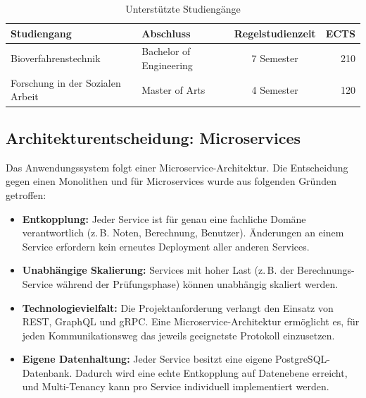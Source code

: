 \documentclass[12pt,a4paper,ngerman]{article}
\begin{document}
\begin{table}[H]
\centering
\caption{Unterstützte Studiengänge}
\begin{tabular}{llcr}
\toprule
\textbf{Studiengang} & \textbf{Abschluss} & \textbf{Regelstudienzeit} & \textbf{ECTS} \\
\midrule
Bioverfahrenstechnik & Bachelor of Engineering & 7 Semester & 210 \\
Forschung in der Sozialen Arbeit & Master of Arts & 4 Semester & 120 \\
\bottomrule
\end{tabular}
\end{table}

\subsection{Architekturentscheidung: Microservices}

Das Anwendungssystem folgt einer Microservice-Architektur. Die Entscheidung gegen einen Monolithen und für Microservices wurde aus folgenden Gründen getroffen:

\begin{itemize}[nosep]
\item \textbf{Entkopplung:} Jeder Service ist für genau eine fachliche Domäne verantwortlich (z.\,B. Noten, Berechnung, Benutzer). Änderungen an einem Service erfordern kein erneutes Deployment aller anderen Services.
\item \textbf{Unabhängige Skalierung:} Services mit hoher Last (z.\,B. der Berechnungs-Service während der Prüfungsphase) können unabhängig skaliert werden.
\item \textbf{Technologievielfalt:} Die Projektanforderung verlangt den Einsatz von REST, GraphQL und gRPC. Eine Microservice-Architektur ermöglicht es, für jeden Kommunikationsweg das jeweils geeignetste Protokoll einzusetzen.
\item \textbf{Eigene Datenhaltung:} Jeder Service besitzt eine eigene PostgreSQL-Datenbank. Dadurch wird eine echte Entkopplung auf Datenebene erreicht, und Multi-Tenancy kann pro Service individuell implementiert werden.
\end{itemize}
\end{document}
